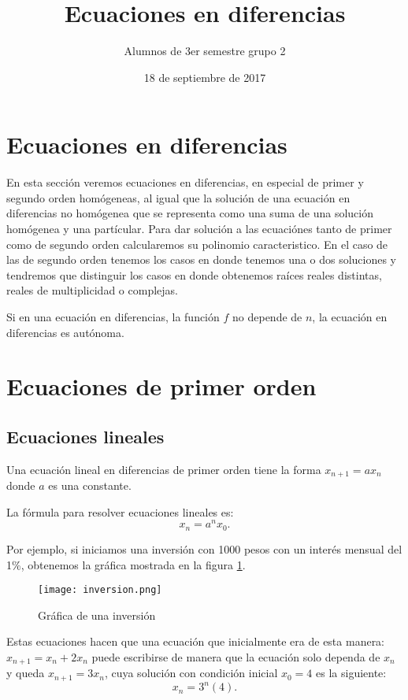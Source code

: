 \documentclass{article}
\title{Ecuaciones en diferencias}
\author{Alumnos de 3er semestre grupo 2}
\date{18 de septiembre de 2017}
\begin{document}
\maketitle
\tableofcontents

\section{Ecuaciones en diferencias}
\label{sec:ecuaciones}

En esta sección veremos ecuaciones en diferencias, en especial de
primer y segundo orden homógeneas, al igual que la solución de una
ecuación en diferencias no homógenea que se representa como una suma
de una solución homógenea y una partícular.  Para dar solución a las
ecuaciónes tanto de primer como de segundo orden calcularemos su
polinomio caracteristico. En el caso de las de segundo orden tenemos
los casos en donde tenemos una o dos soluciones y tendremos que
distinguir los casos en donde obtenemos raíces reales distintas,
reales de multiplicidad o complejas.

Si en una ecuación en diferencias, la función $f$ no depende de $n$,
la ecuación en diferencias es autónoma.

\section{Ecuaciones de primer orden}

\subsection{Ecuaciones lineales}

Una ecuación lineal en diferencias de primer orden tiene la forma
$x_{n+1}=ax_n$ donde $a$ es una constante.

La fórmula para resolver ecuaciones lineales es:
\begin{equation}
  \label{lineal}
  x_n=a^nx_0.
\end{equation}

Por ejemplo, si iniciamos una inversión con 1000 pesos con un interés
mensual del 1\%, obtenemos la gráfica mostrada en la figura
\ref{inversion}.

\begin{figure}
  \centering
  \texttt{[image: inversion.png]}
  \caption{Gráfica de una inversión}
  \label{inversion}
\end{figure}

Estas ecuaciones hacen que una ecuación que inicialmente era de esta
manera: $x_{n+1}=x_n+2x_n$ puede escribirse de manera que la ecuación
solo dependa de $x_n$ y queda $x_{n+1}=3x_n$, cuya solución con
condición inicial $x_0=4$ es la siguiente:
$$x_n=3^n(4).$$
\end{document}

